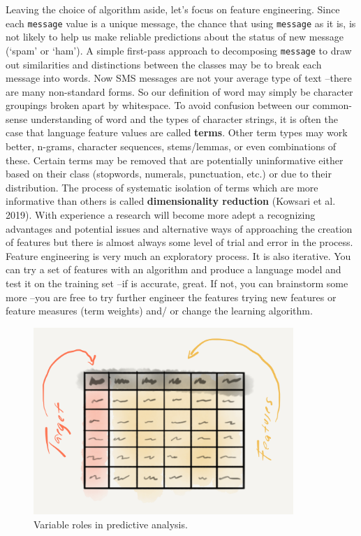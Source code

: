\documentclass[
  letterpaper,
]{scrbook}
\begin{document}
Leaving the choice of algorithm aside, let's focus on feature
engineering. Since each \texttt{message} value is a unique message, the
chance that using \texttt{message} as it is, is not likely to help us
make reliable predictions about the status of new message (`spam' or
`ham'). A simple first-pass approach to decomposing \texttt{message} to
draw out similarities and distinctions between the classes may be to
break each message into words. Now SMS messages are not your average
type of text --there are many non-standard forms. So our definition of
word may simply be character groupings broken apart by whitespace. To
avoid confusion between our common-sense understanding of word and the
types of character strings, it is often the case that language feature
values are called \textbf{terms}. Other term types may work better,
n-grams, character sequences, stems/lemmas, or even combinations of
these. Certain terms may be removed that are potentially uninformative
either based on their class (stopwords, numerals, punctuation, etc.) or
due to their distribution. The process of systematic isolation of terms
which are more informative than others is called \textbf{dimensionality
reduction} (Kowsari et al. 2019). With experience a research will become
more adept a recognizing advantages and potential issues and alternative
ways of approaching the creation of features but there is almost always
some level of trial and error in the process. Feature engineering is
very much an exploratory process. It is also iterative. You can try a
set of features with an algorithm and produce a language model and test
it on the training set --if is accurate, great. If not, you can
brainstorm some more --you are free to try further engineer the features
trying new features or feature measures (term weights) and/ or change
the learning algorithm.

\begin{figure}[h]

{\centering \includegraphics[width=3.88in,height=\textheight]{./figures/approaching-analysis/predictive-variables.png}

}

\caption{\label{fig-aa-predictive-variables}Variable roles in predictive
analysis.}

\end{figure}
\end{document}
